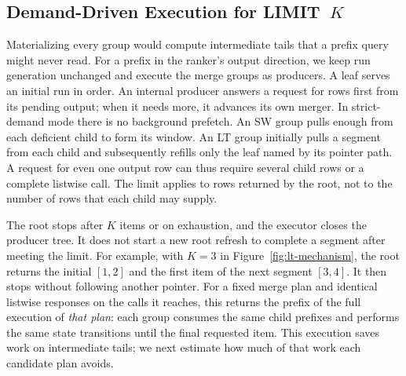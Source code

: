 \subsection{Demand-Driven Execution for \textsf{LIMIT}~$K$}
\label{sec:topk}\label{sec:topk-exec}
Materializing every group would compute intermediate tails that a prefix query might never read. For a prefix in the ranker's output direction, we keep run generation unchanged and execute the merge groups as producers. A leaf serves an initial run in order. An internal producer answers a request for rows first from its pending output; when it needs more, it advances its own merger. In strict-demand mode there is no background prefetch. An SW group pulls enough from each deficient child to form its window. An LT group initially pulls a segment from each child and subsequently refills only the leaf named by its pointer path. A request for even one output row can thus require several child rows or a complete listwise call. The limit applies to rows returned by the root, not to the number of rows that each child may supply.

The root stops after $K$ items or on exhaustion, and the executor closes the producer tree. It does not start a new root refresh to complete a segment after meeting the limit. For example, with $K=3$ in Figure~\ref{fig:lt-mechanism}, the root returns the initial $[1,2]$ and the first item of the next segment $[3,4]$. It then stops without following another pointer. For a fixed merge plan and identical listwise responses on the calls it reaches, this returns the prefix of the full execution of \emph{that plan}: each group consumes the same child prefixes and performs the same state transitions until the final requested item. This execution saves work on intermediate tails; we next estimate how much of that work each candidate plan avoids.
